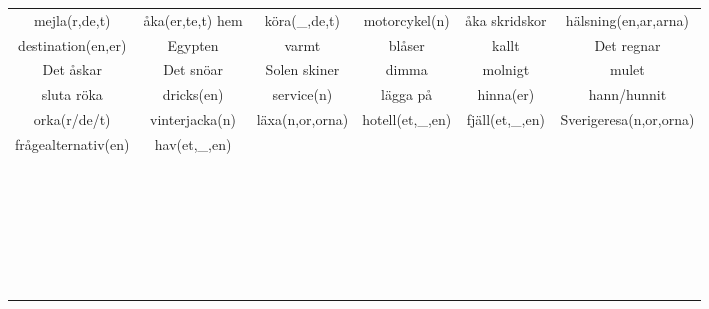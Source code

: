 \begin{center}
\begin{adjustwidth}{-2.5cm}{}
\begin{tabular}{|c c c c c c|}
            mejla(r,de,t) & åka(er,te,t) hem & köra(\_,de,t) & motorcykel(n) & åka skridskor & hälsning(en,ar,arna) \\
            destination(en,er) & Egypten & varmt & blåser & kallt & Det regnar \\
            Det åskar & Det snöar & Solen skiner & dimma & molnigt & mulet \\
            sluta röka & dricks(en) & service(n) & lägga på & hinna(er) & hann/hunnit \\
            orka(r/de/t) & vinterjacka(n) & läxa(n,or,orna) & hotell(et,\_,en) & fjäll(et,\_,en) & Sverigeresa(n,or,orna) \\
            frågealternativ(en) & hav(et,\_,en) &  &  &  &  \\
             &  &  &  &  &  \\
             &  &  &  &  &  \\
             &  &  &  &  &  \\
             &  &  &  &  &  \\
             &  &  &  &  &  \\
             &  &  &  &  &  \\
             &  &  &  &  &  \\
             &  &  &  &  &  \\
             &  &  &  &  &  \\
             &  &  &  &  &  \\
             &  &  &  &  &  \\
             &  &  &  &  &  \\
             &  &  &  &  &  \\
             &  &  &  &  &  \\
             &  &  &  &  &  \\
             &  &  &  &  &  \\
             &  &  &  &  &  \\
             &  &  &  &  &  \\
             &  &  &  &  &  \\
             &  &  &  &  &  \\
             &  &  &  &  &  \\
             &  &  &  &  &  \\
             &  &  &  &  &  \\
             &  &  &  &  &  \\
             &  &  &  &  &  \\
             &  &  &  &  &  \\
             &  &  &  &  &  \\
            \hline
        \end{tabular}
    \end{adjustwidth}
\end{center}


